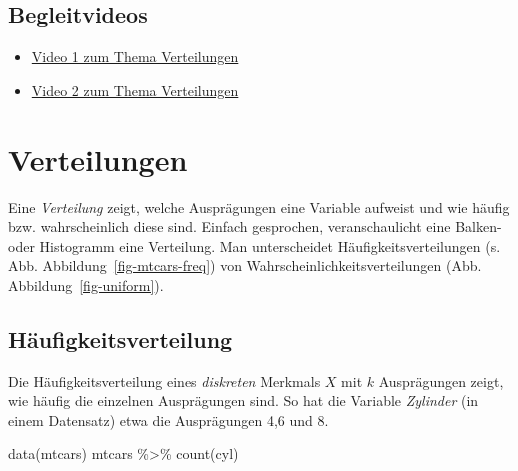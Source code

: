 \documentclass[
  a4paper,
  DIV=11]{scrreprt}
\newenvironment{Shaded}{\begin{snugshade}}{\end{snugshade}}
\newcommand{\FunctionTok}[1]{\textcolor[rgb]{0.28,0.35,0.67}{#1}}
\newcommand{\NormalTok}[1]{\textcolor[rgb]{0.00,0.23,0.31}{#1}}
\newcommand{\SpecialCharTok}[1]{\textcolor[rgb]{0.37,0.37,0.37}{#1}}
\providecommand{\tightlist}{%
  \setlength{\itemsep}{0pt}\setlength{\parskip}{0pt}}\usepackage{longtable,booktabs,array}
\theoremstyle{definition}
\theoremstyle{remark}
\begin{document}
\hypertarget{begleitvideos-2}{%
\subsection{Begleitvideos}\label{begleitvideos-2}}

\begin{itemize}
\tightlist
\item
  \href{https://youtu.be/7GqIE4sKDs4}{Video 1 zum Thema Verteilungen}
\item
  \href{https://youtu.be/HKWwondYsW8}{Video 2 zum Thema Verteilungen}
\end{itemize}

\hypertarget{verteilungen-2}{%
\section{Verteilungen}\label{verteilungen-2}}

\begin{tcolorbox}[enhanced jigsaw, leftrule=.75mm, left=2mm, bottomrule=.15mm, opacityback=0, coltitle=black, colbacktitle=quarto-callout-important-color!10!white, opacitybacktitle=0.6, rightrule=.15mm, toptitle=1mm, colback=white, colframe=quarto-callout-important-color-frame, arc=.35mm, toprule=.15mm, breakable, titlerule=0mm, bottomtitle=1mm, title=\textcolor{quarto-callout-important-color}{\faExclamation}\hspace{0.5em}{Wichtig}]
Eine \emph{Verteilung} zeigt, welche Ausprägungen eine Variable aufweist
und wie häufig bzw. wahrscheinlich diese sind. Einfach gesprochen,
veranschaulicht eine Balken- oder Histogramm eine Verteilung. Man
unterscheidet Häufigkeitsverteilungen (s. Abb.
Abbildung~\ref{fig-mtcars-freq}) von Wahrscheinlichkeitsverteilungen
(Abb. Abbildung~\ref{fig-uniform}).
\end{tcolorbox}

\hypertarget{huxe4ufigkeitsverteilung}{%
\subsection{Häufigkeitsverteilung}\label{huxe4ufigkeitsverteilung}}

Die Häufigkeitsverteilung eines \emph{diskreten} Merkmals \(X\) mit
\(k\) Ausprägungen zeigt, wie häufig die einzelnen Ausprägungen sind. So
hat die Variable \emph{Zylinder} (in einem Datensatz) etwa die
Ausprägungen 4,6 und 8.

\begin{Shaded}
\begin{Highlighting}[]
\FunctionTok{data}\NormalTok{(mtcars)}
\NormalTok{  mtcars }\SpecialCharTok{\%\textgreater{}\%} 
    \FunctionTok{count}\NormalTok{(cyl)}
\end{Highlighting}
\end{Shaded}
\end{document}
